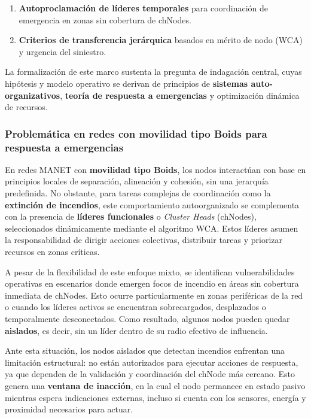 \documentclass{article}
\begin{document}
\begin{enumerate}
    \item \textbf{Autoproclamación de líderes temporales} para coordinación de emergencia en zonas sin cobertura de chNodes.
    \item \textbf{Criterios de transferencia jerárquica} basados en mérito de nodo (WCA) y urgencia del siniestro.
\end{enumerate}

La formalización de este marco sustenta la pregunta de indagación central, cuyas hipótesis y modelo operativo se derivan de principios de \textbf{sistemas auto-organizativos}, \textbf{teoría de respuesta a emergencias} y optimización dinámica de recursos.


\subsubsection{Problemática en redes con movilidad tipo Boids para respuesta a emergencias}  
En redes MANET con \textbf{movilidad tipo Boids}, los nodos interactúan con base en principios locales de separación, alineación y cohesión, sin una jerarquía predefinida. No obstante, para tareas complejas de coordinación como la \textbf{extinción de incendios}, este comportamiento autoorganizado se complementa con la presencia de \textbf{líderes funcionales} o \textit{Cluster Heads} (chNodes), seleccionados dinámicamente mediante el algoritmo WCA. Estos líderes asumen la responsabilidad de dirigir acciones colectivas, distribuir tareas y priorizar recursos en zonas críticas.

A pesar de la flexibilidad de este enfoque mixto, se identifican vulnerabilidades operativas en escenarios donde emergen focos de incendio en áreas sin cobertura inmediata de chNodes. Esto ocurre particularmente en zonas periféricas de la red o cuando los líderes activos se encuentran sobrecargados, desplazados o temporalmente desconectados. Como resultado, algunos nodos pueden quedar \textbf{aislados}, es decir, sin un líder dentro de su radio efectivo de influencia.

Ante esta situación, los nodos aislados que detectan incendios enfrentan una limitación estructural: no están autorizados para ejecutar acciones de respuesta, ya que dependen de la validación y coordinación del chNode más cercano. Esto genera una \textbf{ventana de inacción}, en la cual el nodo permanece en estado pasivo mientras espera indicaciones externas, incluso si cuenta con los sensores, energía y proximidad necesarios para actuar.
\end{document}
